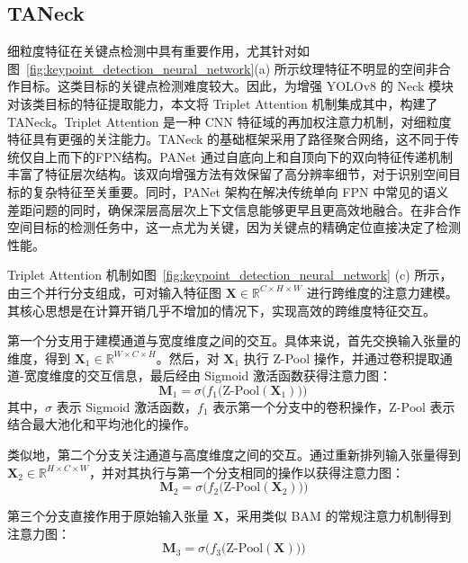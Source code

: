 \subsection{TANeck}
细粒度特征在关键点检测中具有重要作用，尤其针对如图~\ref{fig:keypoint_detection_neural_network}(a) 所示纹理特征不明显的空间非合作目标。这类目标的关键点检测难度较大。因此，为增强 YOLOv8 的 Neck 模块对该类目标的特征提取能力，本文将 Triplet Attention \cite{Misra_2021_WACV} 机制集成其中，构建了 TANeck。Triplet Attention 是一种 CNN 特征域的再加权注意力机制，对细粒度特征具有更强的关注能力。TANeck 的基础框架采用了路径聚合网络，这不同于传统仅自上而下的FPN结构\cite{fpn}。PANet 通过自底向上和自顶向下的双向特征传递机制丰富了特征层次结构。该双向增强方法有效保留了高分辨率细节，对于识别空间目标的复杂特征至关重要。同时，PANet 架构在解决传统单向 FPN 中常见的语义差距问题的同时，确保深层高层次上下文信息能够更早且更高效地融合。在非合作空间目标的检测任务中，这一点尤为关键，因为关键点的精确定位直接决定了检测性能。

Triplet Attention 机制如图~\ref{fig:keypoint_detection_neural_network} (c) 所示，由三个并行分支组成，可对输入特征图 $\mathbf{X} \in \mathbb{R}^{C \times H \times W}$ 进行跨维度的注意力建模。其核心思想是在计算开销几乎不增加的情况下，实现高效的跨维度特征交互。

第一个分支用于建模通道与宽度维度之间的交互。具体来说，首先交换输入张量的维度，得到 $\mathbf{X}_{1} \in \mathbb{R}^{W \times C \times H}$。然后，对 $\mathbf{X}_{1}$ 执行 Z-Pool 操作，并通过卷积提取通道-宽度维度的交互信息，最后经由 Sigmoid 激活函数获得注意力图：
\begin{equation} 
	\mathbf{M}_{1} = \sigma\!\Big(f_{1}\big(\text{Z-Pool}(\mathbf{X}_{1})\big)\Big)\,
\end{equation}
其中，$\sigma$ 表示 Sigmoid 激活函数，$f_{1}$ 表示第一个分支中的卷积操作，$\text{Z-Pool}$ 表示结合最大池化和平均池化的操作。

类似地，第二个分支关注通道与高度维度之间的交互。通过重新排列输入张量得到 $\mathbf{X}_{2} \in \mathbb{R}^{H \times C \times W}$，并对其执行与第一个分支相同的操作以获得注意力图：
\begin{equation} 
	\mathbf{M}_{2} = \sigma\!\Big(f_{2}\big(\text{Z-Pool}(\mathbf{X}_{2})\big)\Big)
\end{equation}

第三个分支直接作用于原始输入张量 $\mathbf{X}$，采用类似 BAM 的常规注意力机制得到注意力图：
\begin{equation} 
	\mathbf{M}_{3} = \sigma\!\Big(f_{3}\big(\text{Z-Pool}(\mathbf{X})\big)\Big)
\end{equation}

